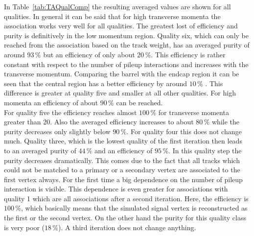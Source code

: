 In Table~\ref{tab:TAQualComp} the resulting averaged values are shown for all qualities. In general it can be said that for high transverse momenta the association works very well for all qualities. The greatest lost of efficiency and purity is definitively in the low momentum region. Quality six, which can only be reached from the association based on the track weight, has an averaged purity of around $93\,\%$ but an efficiency of only about $20\,\%$. This efficiency is rather constant with respect to the number of pileup interactions and increases with the transverse momentum. Comparing the barrel with the endcap region it can be seen that the central region has a better efficiency by around $10\,\%$ . This difference is greater at quality five and smaller at all other qualities. For high momenta an efficiency of about $90\,\%$ can be reached. \\
For quality five the efficiency reaches almost $100\,\%$ for transverse momenta greater than 20\GeV. Also the averaged efficiency increases to about $80\,\%$  while the purity decreases only slightly below $90\,\%$. For quality four this does not change much. Quality three, which is the lowest quality of the first iteration then leads to an averaged purity of $44\,\%$ and an efficiency of $95\,\%$. In this quality step the purity decreases dramatically. This comes due to the fact that all tracks which could not be matched to a primary or a secondary vertex are associated to the first vertex always. For the first time a big dependence on the number of pileup interaction is visible. This dependence is even greater for associations with quality 1 which are all associations after a second iteration. Here, the efficiency is $100\,\%$, which basically means that the simulated signal vertex is reconstructed as the first or the second vertex. On the other hand the purity for this quality class is very poor ($18\,\%$). A third iteration does not change anything. \\

